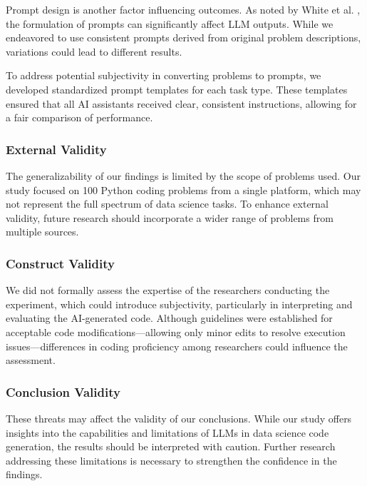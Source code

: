 \documentclass[conference]{IEEEtran}
\begin{document}
Prompt design is another factor influencing outcomes. As noted by White et al. \cite{white2023chatgpt}, the formulation of prompts can significantly affect LLM outputs. While we endeavored to use consistent prompts derived from original problem descriptions, variations could lead to different results.

To address potential subjectivity in converting problems to prompts, we developed standardized prompt templates for each task type. These templates ensured that all AI assistants received clear, consistent instructions, allowing for a fair comparison of performance.

\subsubsection{External Validity}

The generalizability of our findings is limited by the scope of problems used. Our study focused on 100 Python coding problems from a single platform, which may not represent the full spectrum of data science tasks. To enhance external validity, future research should incorporate a wider range of problems from multiple sources.

\subsubsection{Construct Validity}

We did not formally assess the expertise of the researchers conducting the experiment, which could introduce subjectivity, particularly in interpreting and evaluating the AI-generated code. Although guidelines were established for acceptable code modifications—allowing only minor edits to resolve execution issues—differences in coding proficiency among researchers could influence the assessment.

\subsubsection{Conclusion Validity}
These threats may affect the validity of our conclusions. While our study offers insights into the capabilities and limitations of LLMs in data science code generation, the results should be interpreted with caution. Further research addressing these limitations is necessary to strengthen the confidence in the findings.


\end{document}
